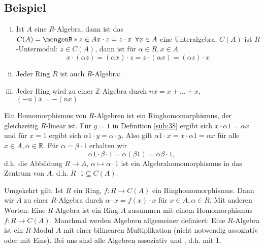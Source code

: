 \subsection[Beispiele für Algebren, Zentrum einer Algebra]{Beispiel} %
\label{sub:39}
\begin{enumerate}[(i)]
	\item Ist $A$ eine $R$-Algebra, dann ist das  $C(A) = \set[z \in A]{x \cdot z = z \cdot x \enspace \forall x \in A} $ eine Unteralgebra. 
	$C(A)$ ist $R$-Untermodul: $z \in C(A)$, dann ist für $\alpha \in R, x \in A$
		\[
			x \cdot (\alpha z) = (\alpha x) \cdot z = z \cdot (\alpha x) = (\alpha z) \cdot x
		\]
	\item Jeder Ring $R$ ist auch $R$-Algebra: 
	\item Jeder Ring wird zu einer $\mathds{Z}$-Algebra durch $n x = x + \ldots + x$, $(-n) x = - (n x)$
\end{enumerate}
Ein Homomorphismus von $R$-Algebren ist ein Ringhomomorphismus, der gleichzeitig $R$-linear ist.
Für $y=1$ in Definition \ref{sub:38} ergibt sich $x \cdot  \alpha 1 = \alpha x$ und für $x=1$ ergibt sich $\alpha 1 \cdot y = \alpha \cdot y$. Also gilt 
$\alpha 1  \cdot x = x \cdot  \alpha 1 = \alpha x$ für alle $x \in A, \alpha \in \mathds{R}$. Für $\alpha = \beta \cdot 1$ erhalten wir 
\[
	\alpha 1 \cdot \beta \cdot 1 = \alpha (\beta 1) = \alpha \beta \cdot 1,
\]
d.h. die Abbildung $R \to A$, $\alpha \mapsto \alpha \cdot 1$ ist ein Algebrahomomorphismus in das Zentrum von $A$, d.h. $R \cdot 1 \subseteq C(A)$.

Umgekehrt gilt: Ist $R$ ein Ring, $f : R \to C(A)$ ein Ringhomomorphismus. Dann wir $A$ zu einer $R$-Algebra durch $\alpha \cdot x = f(x) \cdot x$ für $x\in A,\alpha\in R$.
Mit anderen Worten: Eine $R$-Algebra ist ein Ring $A$ zusammen mit einem Homomorphismus $f : R \to C(A)$. Manchmal werden Algebren allgemeiner definiert: Eine $R$-Algebra 
ist ein $R$-Modul $A$ mit einer bilinearen Multiplikation (nicht notwendig assoziativ oder mit Eins). Bei uns sind alle Algebren assoziativ und , d.h. mit 1. 

